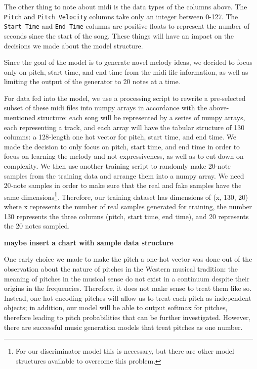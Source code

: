 \documentclass[12pt,oneside]{chicagocapstone}
\begin{document}
The other thing to note about midi is the data types of the columns above. The \texttt{Pitch} and \texttt{Pitch\ Velocity} columns take only an integer between 0-127. The \texttt{Start\ Time} and \texttt{End\ Time} columns are positive floats to represent the number of seconds since the start of the song. These things will have an impact on the decisions we made about the model structure.

Since the goal of the model is to generate novel melody ideas, we decided to focus only on pitch, start time, and end time from the midi file information, as well as limiting the output of the generator to 20 notes at a time.

For data fed into the model, we use a processing script to rewrite a pre-selected subset of these midi files into numpy arrays in accordance with the above-mentioned structure: each song will be represented by a series of numpy arrays, each representing a track, and each array will have the tabular structure of 130 columns: a 128-length one hot vector for pitch, start time, and end time. We made the decision to only focus on pitch, start time, and end time in order to focus on learning the melody and not expressiveness, as well as to cut down on complexity. We then use another training script to randomly make 20-note samples from the training data and arrange them into a numpy array. We need 20-note samples in order to make sure that the real and fake samples have the same dimensions\footnote{For our discriminator model this is necessary, but there are other model structures available to overcome this problem.}. Therefore, our training dataset has dimensions of (x, 130, 20) where x represents the number of real samples generated for training, the number 130 represents the three columns (pitch, start time, end time), and 20 represents the 20 notes sampled.

\textbf{maybe insert a chart with sample data structure}

One early choice we made to make the pitch a one-hot vector was done out of the observation about the nature of pitches in the Western musical tradition: the meaning of pitches in the musical sense do not exist in a continuum despite their origins in the frequencies. Therefore, it does not make sense to treat them like so. Instead, one-hot encoding pitches will allow us to treat each pitch as independent objects; in addition, our model will be able to output softmax for pitches, therefore leading to pitch probabilities that can be further investigated. However, there are successful music generation models that treat pitches as one number.
\end{document}
